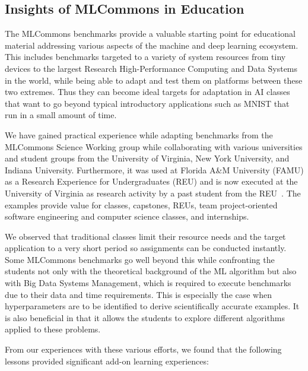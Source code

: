 \documentclass[utf8]{FrontiersinVancouver} %
\begin{document}
\subsection{Insights of MLCommons in Education}
\label{sec:edu-mlcommons-insights}

The MLCommons benchmarks provide a valuable starting point for educational material addressing various aspects of the machine and deep learning ecosystem. This includes benchmarks targeted to a variety of system resources from tiny devices to the largest Research High-Performance Computing and Data Systems in the world, while being able to adapt and test them on platforms between these two extremes. Thus they can become ideal targets for adaptation in AI classes that want to go beyond typical introductory applications such as MNIST that run in a small amount of time.

We have gained practical experience while adapting benchmarks from the MLCommons Science Working group while collaborating with various universities and student groups from the University of Virginia, New York University, and Indiana University. Furthermore, it was used at Florida A\&M University (FAMU) as a Research Experience for Undergraduates (REU) and is now executed at the University of Virginia as research activity by a past student from the REU~\cite{las-2022-mdpi-crypto}. The examples provide value for classes, capstones, REUs, team project-oriented software engineering and computer science classes, and internships.

We observed that traditional classes limit their resource needs and the target application to a very short period so assignments can be conducted instantly.  Some MLCommons benchmarks go well beyond this while confronting the students not only with the theoretical background of the ML algorithm but also with Big Data Systems Management, which is required to execute benchmarks due to their data and time requirements. This is especially the case when hyperparameters are to be identified to derive scientifically accurate examples. It is also beneficial in that it allows the students to explore different algorithms applied to these problems.

From our experiences with these various efforts, we found that the following lessons provided significant add-on learning experiences:
\end{document}
